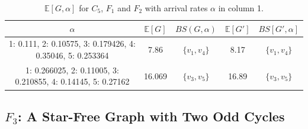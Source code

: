 \documentclass{llncs}
\begin{document}
\begin{table}[htbp]
\caption{$\mathbb{E}[G,\alpha]$ for $C_5$, $F_1$ and $F_2$ with arrival rates  $\alpha$ in column 1.}
\label{tab:computex}
\centering
\begin{tabular}{c|c|c|c|c}
\hline
$\alpha$ & $\mathbb{E}[G]$ & $BS(G,\alpha)$ & $\mathbb{E}[G']$ & $BS[G',\alpha]$\\
 \hline
 {1: 0.111, 2: 0.10575, 3: 0.179426, 4: 0.35046, 5: 0.253364} & 7.86 & $\{v_1,v_4\}$  & 8.17 & $\{v_1,v_4\}$ \\
 \hline
 {1: 0.266025, 2: 0.11005, 3: 0.210855, 4: 0.14145, 5: 0.27162} & 16.069 & $\{v_3,v_5\}$  & 16.89 & $\{v_3,v_5\}$ \\
 \hline
\end{tabular}
\end{table}

\subsection{$F_3$: A Star-Free Graph with Two Odd Cycles}
\end{document}
